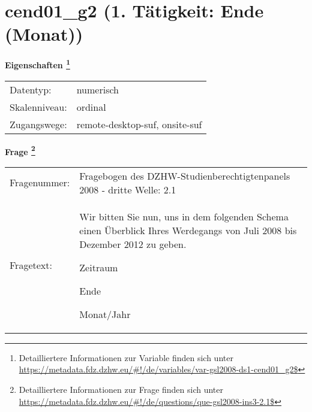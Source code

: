 
    \setcounter{footnote}{0}

    \vspace*{-1.8cm}
	\section{cend01\_g2 (1. Tätigkeit: Ende (Monat))}
	\label{section:cend01_g2}



    \vspace*{0.5cm}
    \noindent\textbf{Eigenschaften
	\footnote{Detailliertere Informationen zur Variable finden sich unter
		\url{https://metadata.fdz.dzhw.eu/\#!/de/variables/var-gsl2008-ds1-cend01_g2$}}}\\
	\begin{tabularx}{\hsize}{@{}lX}
	Datentyp: & numerisch \\
	Skalenniveau: & ordinal \\
	Zugangswege: &
	  remote-desktop-suf, 
	  onsite-suf
 \\
    \end{tabularx}



				\vspace*{0.5cm}
                \noindent\textbf{Frage
	                \footnote{Detailliertere Informationen zur Frage finden sich unter
		              \url{https://metadata.fdz.dzhw.eu/\#!/de/questions/que-gsl2008-ins3-2.1$}}}\\
				\begin{tabularx}{\hsize}{@{}lX}
					Fragenummer: &
					  Fragebogen des DZHW-Studienberechtigtenpanels 2008 - dritte Welle:
					  2.1
 \\
					Fragetext: & Wir bitten Sie nun, uns in dem folgenden Schema einen Überblick Ihres Werdegangs von Juli 2008 bis Dezember 2012 zu geben.\par  Zeitraum\par  Ende\par  Monat/Jahr \\
				\end{tabularx}





